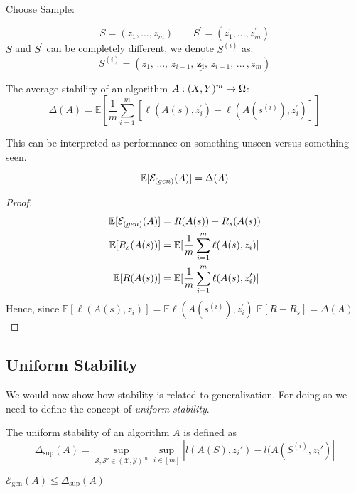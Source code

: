 Choose Sample:

$$S = (z_1, ... , z_m) \quad \quad  S^{\prime} = (z^{\prime}_1, ... ,z^{\prime}_{m})$$ 
$S$ and $S^{\prime}$ can be completely different, we denote $S^{(i)}$ as:
$$S^{(i)} = (z_1, \,... ,\, z_{i-1}, \,\underline{\mathbf{z_{i}^{\prime}}},\, z_{i+1}, \,... \,,z_{m})$$
\begin{definition} The average stability of an algorithm $A: (X,Y)^{m} \rightarrow \Omega$:
$$\Delta(A) = \mathbb{E}[\frac{1}{m}\sum_{i=1}^{m}[\ell(A(s),z_i^{\prime}) - \ell(A(s^{(i)}),z_{i}^{\prime})]]$$
\end{definition}
This can be interpreted as performance on something unseen versus something seen.
\begin{theorem}
$$\mathbb{E}[\mathcal{E}_{\text(gen)}(A)] = \Delta(A)$$
\end{theorem}
\begin{proof}
\begin{align*}
\mathbb{E}[\mathcal{E}_{\text(gen)}(A)]  &= R(A(s)) - R_{s}(A(s)) \\
\mathbb{E} [R_{s}(A(s))] &= \mathbb{E}[\frac{1}{m}\sum_{i=1}^{m}\ell(A(s),z_i)] \\
\mathbb{E} [R(A(s))]&= \mathbb{E}[\frac{1}{m}\sum_{i=1}^{m}\ell(A(s),z_i^{\prime})]
\end{align*}
Hence, since $\mathbb{E}[\ell(A(s),z_i)] = \mathbb{E}\ell(A(s^{(i)}),z_i^{\prime})$
$\mathbb{E}[R - R_s] = \Delta(A)$
\end{proof}





\subsection{Uniform Stability}
We would now show how stability is related to generalization. For doing so we need to define the concept of \textit{uniform stability}.

\begin{definition}The uniform stability of an algorithm $A$ is defined as 
\begin{equation*}
\Delta_{\sup} (A) = \sup_{\mathcal{S}, \mathcal{S}' \in ( \mathcal{X}, \mathcal{Y} )^m } \sup_{i \in [m]} |l(A(S), z_i') - l(A(S^{(i)}, z_i')|
\end{equation*}
\end{definition}

\begin{corollary}
    $\mathcal{E}_{\text{gen}}(A) \leq \Delta_{\sup} (A)$
\end{corollary}

